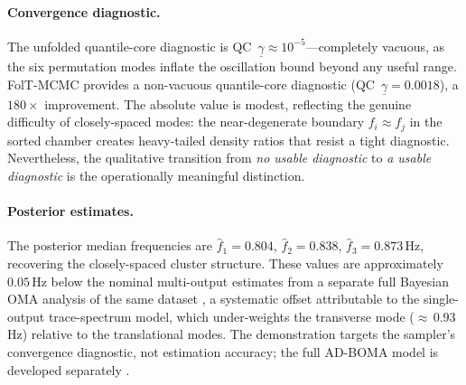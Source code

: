\paragraph{Convergence diagnostic.}
The unfolded quantile-core diagnostic is
QC~$\underline{\gamma} \approx 10^{-5}$---completely vacuous, as
the six permutation modes inflate the oscillation bound beyond
any useful range.  FolT-MCMC provides a non-vacuous quantile-core diagnostic
(QC~$\underline{\gamma} = 0.0018$), a $180\times$
improvement.  The absolute value is modest, reflecting the genuine
difficulty of closely-spaced modes: the near-degenerate boundary
$f_i \approx f_j$ in the sorted chamber creates heavy-tailed
density ratios that resist a tight diagnostic.  Nevertheless, the
qualitative transition from \emph{no usable diagnostic} to
\emph{a usable diagnostic} is the operationally meaningful distinction.

\paragraph{Posterior estimates.}
The posterior median frequencies are
$\hat{f}_1 = 0.804$, $\hat{f}_2 = 0.838$, $\hat{f}_3 = 0.873$\,Hz,
recovering the closely-spaced cluster structure.  These values are
approximately $0.05$\,Hz below the nominal multi-output estimates
from a separate full Bayesian OMA analysis of the same dataset
\citep{SATMCMCpaper}, a systematic offset attributable to the
single-output trace-spectrum model, which under-weights the
transverse mode (${\approx}\,0.93$\,Hz) relative to the
translational modes.  The demonstration targets the sampler's
convergence diagnostic, not estimation accuracy;
the full AD-BOMA model is developed separately
\citep{SATMCMCpaper}.
